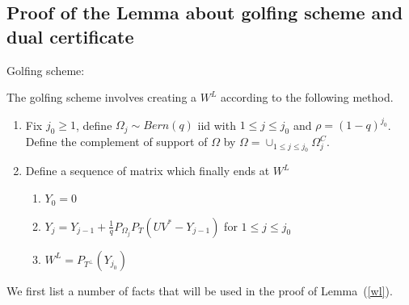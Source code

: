 \newpage
\subsection{Proof of the Lemma about golfing scheme and dual certificate }
Golfing scheme:

The golfing scheme involves creating a $W^{L}$ according to the following method.
\begin{enumerate}
\item Fix $j_{0}\ge1$, define $\Omega_{j}\sim Bern(q)$ iid with $1\le j\le j_{0}$ and $\rho=(1-q)^{j_{0}}$. Define the complement of support of $\Omega$ by $\Omega=\cup_{1\le j\le j_{0}}\Omega_{j}^{C}$.
\item Define a sequence of matrix which finally ends at $W^{L}$

\begin{enumerate}
\item $Y_{0}=0$
\item $Y_{j}=Y_{j-1}+\frac{1}{q}P_{\Omega_{j}}P_{T}(UV^{*}-Y_{j-1})$ for $1\le j\le j_{0}$
\item $W^{L}=P_{\ensuremath{T^{\bot}}}(Y_{j_{0}})$
\end{enumerate}

\end{enumerate}

We first list a number of facts that will be used in the proof of Lemma~(\ref{wl}).

